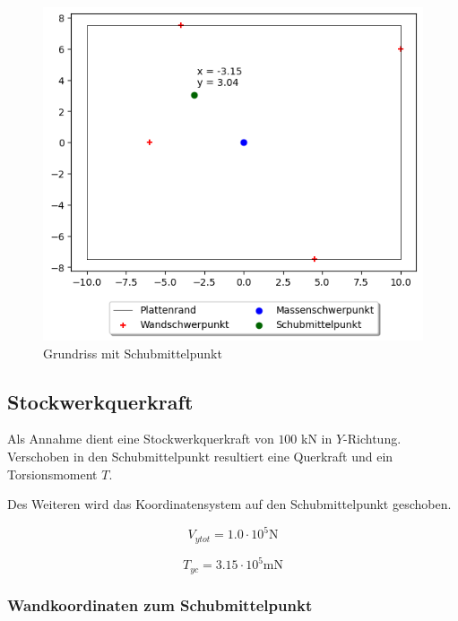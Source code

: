 \documentclass[
  letterpaper,
  DIV=11]{scrreprt}
\begin{document}
\begin{figure}[H]

{\centering \includegraphics{U4_EKV_files/figure-pdf/fig-darstellung_berechnung-output-1.png}

}

\caption{\label{fig-darstellung_berechnung}Grundriss mit
Schubmittelpunkt}

\end{figure}

\hypertarget{stockwerkquerkraft}{%
\subsection{Stockwerkquerkraft}\label{stockwerkquerkraft}}

Als Annahme dient eine Stockwerkquerkraft von \(100\) kN in
\(Y\)-Richtung. Verschoben in den Schubmittelpunkt resultiert eine
Querkraft und ein Torsionsmoment \(T\).

Des Weiteren wird das Koordinatensystem auf den Schubmittelpunkt
geschoben.

\begin{equation*}V_{y tot} = 1.0 \cdot 10^{5} \text{N}\end{equation*}

\begin{equation*}T_{yc} = 3.15 \cdot 10^{5} \text{m} \text{N}\end{equation*}

\hypertarget{wandkoordinaten-zum-schubmittelpunkt}{%
\subsubsection{Wandkoordinaten zum
Schubmittelpunkt}\label{wandkoordinaten-zum-schubmittelpunkt}}
\end{document}
